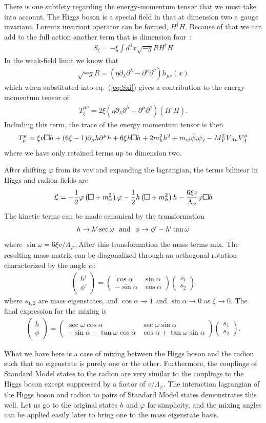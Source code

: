 \documentclass[12pt]{article}
\newcommand{\drawsquare}[2]{\hbox{%
\rule{#2pt}{#1pt}\hskip-#2pt%
\rule{#1pt}{#2pt}\hskip-#1pt%
\rule[#1pt]{#1pt}{#2pt}}\rule[#1pt]{#2pt}{#2pt}\hskip-#2pt%
\rule{#2pt}{#1pt}}%
\newcommand{\kbox}{\drawsquare{7}{0.6}}
\def\beq{\begin{eqnarray}}
\def\eeq{\end{eqnarray}}
\def\bea{\begin{eqnarray}}
\def\eea{\end{eqnarray}}
\def\vector#1#2{\left( \begin{array}{c}#1\\ #2\end{array}\right)}
\begin{document}
There is one subtlety regarding the energy-momentum tensor that we must take into account. The Higgs boson is a special field in that at dimension two a gauge invariant, Lorentz invariant operator can be formed, $H^\dagger H$. Because of that we can add to the full action another term that is dimension four~\cite{Giudice:2000av}:
\bea
S_\xi=-\xi\int d^4x\sqrt{-g}RH^\dagger H
\label{eq:Sxi}
\eea
In the weak-field limit we know that
\beq
\sqrt{-g}R=(\eta\partial_\lambda\partial^\lambda-\partial^\mu\partial^\nu)h_{\mu\nu}(x)
\eeq
which when substituted into eq.~(\ref{eq:Sxi}) gives a contribution to the energy momentum tensor of
\beq
 T^{\mu\nu}_\xi=2\xi (\eta\partial_\lambda\partial^\lambda-\partial^\mu\partial^\nu)(H^\dagger H).
\eeq
Including this term, the trace of the energy momentum tensor is then
\beq
T^\mu_\mu=\xi v\kbox h+(6\xi -1) \partial_\mu h\partial^\mu h +6\xi h \kbox h 
+2m_h^2h^2 + m_{ij}\bar\psi_i \psi_j -M_V^2 V_{A\mu}V_A^\mu 
\eeq
where we have only retained terms up to dimension two. 

After shifting $\varphi$ from its vev and expanding the lagrangian, the terms bilinear in Higgs and radion fields are
\beq
{\cal L} =-\frac{1}{2}  \varphi
\left( \kbox +m_\varphi^2 \right) \varphi
-\frac{1}{2} h \left( \kbox +m_h^2 \right) h -\frac{6\xi 
v}{\Lambda_\varphi} \varphi \kbox h
\eeq
The kinetic terms can be made canonical by the transformation
\bea
h\to {h'}\sec\omega ~~{\rm and}~~\phi\to \phi'- h' \tan\omega
\eea
where $\sin\omega=6\xi v/\Lambda_\varphi$.  After this transformation the mass terms mix. The resulting mass matrix can be diagonalized through an orthogonal rotation characterized by the angle $\alpha$:
\beq
\vector{h'}{\phi'}=\left(\begin{array}{cc} \cos\alpha & \sin\alpha \\ -\sin\alpha & \cos\alpha \end{array}\right)
\vector{s_1}{s_2}
\eeq
where $s_{1,2}$ are mass eigenstates, and $\cos\alpha\to 1$ and $\sin\alpha\to 0$ as  $\xi\to 0$.
The final expression for the mixing is
\beq
\vector{h}{\phi}=\left(\begin{array}{cc}
\sec\omega \cos\alpha&\sec\omega \sin\alpha\\
-\sin\alpha -\tan\omega \cos\alpha& \cos\alpha+\tan\omega \sin\alpha
\end{array}\right) \vector{s_1}{s_2}.
\eeq

What we have here is a case of mixing between the Higgs boson and the radion such that no eigenstate is purely one or the other. Furthermore, the couplings of Standard Model states to the radion are very similar to the couplings to the Higgs boson except suppressed by a factor of $v/\Lambda_\varphi$. The interaction lagrangian of the Higgs boson and radion to pairs of Standard Model states demonstrates this well.  Let us go to the original states $h$ and $\varphi$ for simplicity, and the mixing angles can be applied easily later to bring one to the mass eigenstate basis. 
\end{document}

